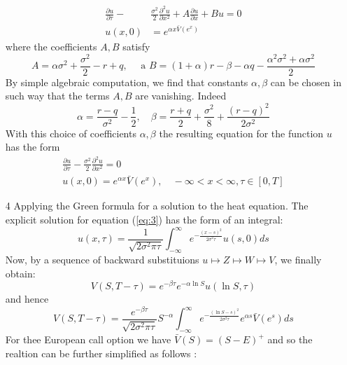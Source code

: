 \documentclass[a4paper]{article}
\begin{document}
\begin{itemize}
\begin{equation}
\begin{aligned}
    \frac{\partial u}{\partial \tau}-& \frac{\sigma^{2}}{2} \frac{\partial^{2} u}{\partial x^{2}}+A \frac{\partial u}{\partial x}+B u=0 \\
    u(x, 0) &=e^{\alpha x \bar{V}\left(e^{x}\right)}
    \end{aligned}
\end{equation}
where the coefficients $A, B$ satisfy 
\begin{equation}
    A=\alpha \sigma^{2}+\frac{\sigma^{2}}{2}-r+q, \quad \text { a } B=(1+\alpha) r-\beta-\alpha q-\frac{\alpha^{2} \sigma^{2}+\alpha \sigma^{2}}{2}
\end{equation}
By simple algebraic computation, we find that constants $\alpha, \beta$ can be chosen in such way that the terms $A, B$ are vanishing. Indeed
\begin{equation}
    \alpha=\frac{r-q}{\sigma^{2}}-\frac{1}{2}, \quad \beta=\frac{r+q}{2}+\frac{\sigma^{2}}{8}+\frac{(r-q)^{2}}{2 \sigma^{2}}
    \label{eq:koef}
\end{equation}
With this choice of coefficients $\alpha, \beta$ the resulting equation for the function $u$ has the form
\begin{align}
    \frac{\partial u}{\partial \tau}-\frac{\sigma^{2}}{2} \frac{\partial^{2} u}{\partial x^{2}}=0 \\
    u(x, 0)=e^{\alpha x} \bar{V}\left(e^{x}\right), \quad-\infty<x<\infty, \tau \in[0, T]
    \label{eq:3}
\end{align}
    \item[4] Applying the Green formula for a solution to the heat equation. The explicit solution for equation (\ref{eq:3}) has the form of an integral:
    \begin{equation}
        u(x, \tau)=\frac{1}{\sqrt{2 \sigma^{2} \pi \tau}} \int_{-\infty}^{\infty} e^{-\frac{(x-s)^{2}}{2 \sigma^{2} \tau}} u(s, 0) d s
    \end{equation}
Now, by a sequence of backward substituions $u \mapsto Z \mapsto W \mapsto V$, we finally obtain:
    \begin{equation}
        V(S, T-\tau)=e^{-\beta \tau} e^{-\alpha \ln S} u(\ln S, \tau)
    \end{equation}
and hence
    \begin{equation}
        V(S, T-\tau)=\frac{e^{-\beta \tau}}{\sqrt{2 \sigma^{2} \pi \tau}} S^{-\alpha} \int_{-\infty}^{\infty} e^{-\frac{(\ln S-s)^{2}}{2 \sigma^{2} \tau}} e^{\alpha s} \bar{V}\left(e^{s}\right) d s
    \end{equation}
For thee European call option we have $\bar{V}(S)=(S-E)^{+}$ and so the realtion can be further simplified as follows :

\end{itemize}
\end{document}
